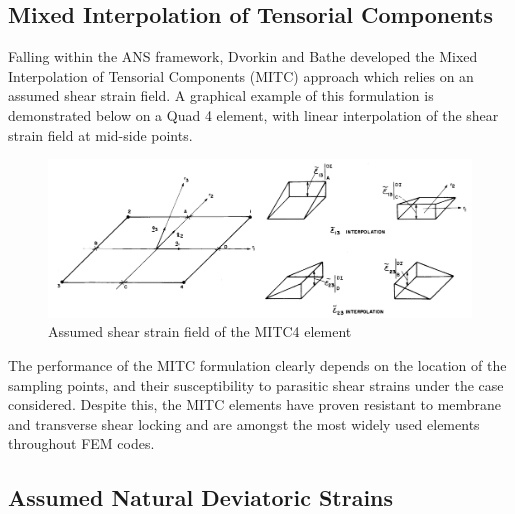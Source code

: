 \subsection{Mixed Interpolation of Tensorial Components}

Falling within the ANS framework, Dvorkin and Bathe \cite{Dvorkin84} \cite{Bathe86} developed the Mixed Interpolation of Tensorial Components (MITC) approach which relies on an assumed shear strain field. A graphical example of this formulation is demonstrated below on a Quad 4 element, with linear interpolation of the shear strain field at mid-side points.

\begin{figure}[H]
	\centering
	\def\svgwidth{\columnwidth}
	\includegraphics[width=16cm]{images/mitc4.png}
	\caption{Assumed shear strain field of the MITC4 element \cite{Bathe86}}
	\label{ansexample}
\end{figure}

The performance of the MITC formulation clearly depends on the location of the sampling points, and their susceptibility to parasitic shear strains under the case considered. Despite this, the MITC elements have proven resistant to membrane and transverse shear locking \cite{Bathe86} and are amongst the most widely used elements throughout FEM codes.

\subsection{Assumed Natural Deviatoric Strains}

